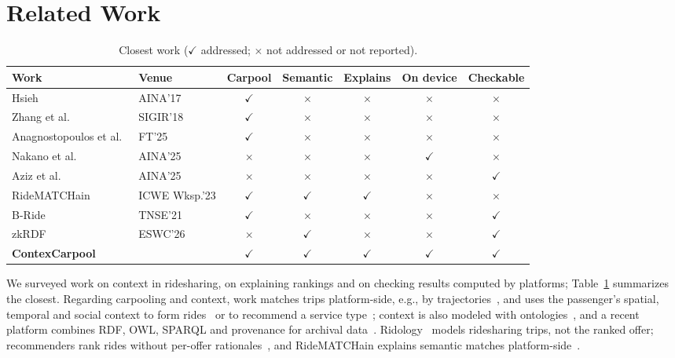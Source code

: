 \documentclass{svproc}
\begin{document}
\section{Related Work}\label{sec:related}
\begin{table}[t]
  \caption{Closest work ($\checkmark$ addressed; $\times$ not addressed or not reported).}
  \label{tab:rw}
  \centering\scriptsize
  \begin{tabular}{@{}llccccc@{}}
    \toprule
    Work & Venue & Carpool & Semantic & Explains & On device & Checkable \\
    \midrule
    Hsieh~\cite{Hsieh2017CarPooling} & AINA'17 & $\checkmark$ & $\times$ & $\times$ & $\times$ & $\times$ \\
    Zhang et al.~\cite{Zhang2018TaxiHitch} & SIGIR'18 & $\checkmark$ & $\times$ & $\times$ & $\times$ & $\times$ \\
    Anagnostopoulos et al.~\cite{Anagnostopoulos2025RideContext} & FT'25 & $\checkmark$ & $\times$ & $\times$ & $\times$ & $\times$ \\
    Nakano et al.~\cite{Nakano2025NewsHE} & AINA'25 & $\times$ & $\times$ & $\times$ & $\checkmark$ & $\times$ \\
    Aziz et al.~\cite{Aziz2025ZkCDP} & AINA'25 & $\times$ & $\times$ & $\times$ & $\times$ & $\checkmark$ \\
    RideMATCHain~\cite{Gramegna2023RideMATCHain} & ICWE Wksp.'23 & $\checkmark$ & $\checkmark$ & $\checkmark$ & $\times$ & $\times$ \\
    B-Ride~\cite{Baza2021BRide} & TNSE'21 & $\checkmark$ & $\times$ & $\times$ & $\times$ & $\checkmark$ \\
    zkRDF~\cite{Braun2026ZkSparql} & ESWC'26 & $\times$ & $\checkmark$ & $\times$ & $\times$ & $\checkmark$ \\
    \midrule
    \textbf{ContexCarpool} &  & $\checkmark$ & $\checkmark$ & $\checkmark$ & $\checkmark$ & $\checkmark$ \\
    \bottomrule
  \end{tabular}
\end{table}

We surveyed work on context in ridesharing, on explaining rankings and on checking results computed by platforms; Table~\ref{tab:rw} summarizes the closest. Regarding carpooling and context, work matches trips platform-side, e.g., by trajectories~\cite{Hsieh2017CarPooling}, and uses the passenger's spatial, temporal and social context to form rides~\cite{Anagnostopoulos2025RideContext} or to recommend a service type~\cite{Zhang2018TaxiHitch}; context is also modeled with ontologies~\cite{Jenevain2024ContextOntology}, and a recent platform combines RDF, OWL, SPARQL and provenance for archival data~\cite{Amato2026SemanticArchival}. Ridology~\cite{wagih2020} models ridesharing trips, not the ranked offer; recommenders rank rides without per-offer rationales~\cite{Psaraftis2024QERide}, and RideMATCHain explains semantic matches platform-side~\cite{Gramegna2023RideMATCHain}.
\end{document}
